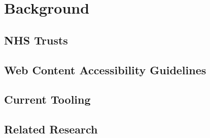 \chapter{Background}\label{cha:background}

\section{NHS Trusts}

\section{Web Content Accessibility Guidelines}

\section{Current Tooling}

\section{Related Research}